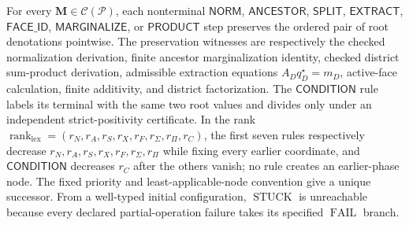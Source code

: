 For every \(\mathbf M\in\mathcal C(\mathcal P)\), each nonterminal \(\mathsf{NORM}\), \(\mathsf{ANCESTOR}\), \(\mathsf{SPLIT}\), \(\mathsf{EXTRACT}\), \(\mathsf{FACE\_ID}\), \(\mathsf{MARGINALIZE}\), or \(\mathsf{PRODUCT}\) step preserves the ordered pair of root denotations pointwise. The preservation witnesses are respectively the checked normalization derivation, finite ancestor marginalization identity, checked district sum-product derivation, admissible extraction equations \(A_Dq_D^\star=m_D\), active-face calculation, finite additivity, and district factorization. The \(\mathsf{CONDITION}\) rule labels its terminal with the same two root values and divides only under an independent strict-positivity certificate. In the rank \(\operatorname{rank}_{\mathrm{lex}}=(r_N,r_A,r_S,r_X,r_F,r_{\Sigma},r_{\Pi},r_C)\), the first seven rules respectively decrease \(r_N,r_A,r_S,r_X,r_F,r_{\Sigma},r_{\Pi}\) while fixing every earlier coordinate, and \(\mathsf{CONDITION}\) decreases \(r_C\) after the others vanish; no rule creates an earlier-phase node. The fixed priority and least-applicable-node convention give a unique successor. From a well-typed initial configuration, \(\operatorname{STUCK}\) is unreachable because every declared partial-operation failure takes its specified \(\operatorname{FAIL}\) branch.